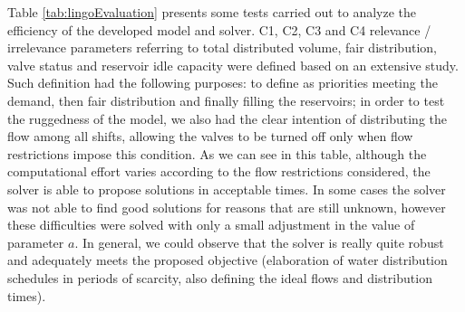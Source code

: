 \documentclass{singlecol}
\theoremstyle{TH}{
\newtheorem{lemma}{Lemma}
\newtheorem{theorem}[lemma]{Theorem}
\newtheorem{corrolary}[lemma]{Corrolary}
\newtheorem{conjecture}[lemma]{Conjecture}
\newtheorem{proposition}[lemma]{Proposition}
\newtheorem{claim}[lemma]{Claim}
\newtheorem{stheorem}[lemma]{Wrong Theorem}
\newtheorem{algorithm}{Algorithm}
}
\theoremstyle{THrm}{
\newtheorem{definition}{Definition}[section]
\newtheorem{question}{Question}[section]
\newtheorem{remark}{Remark}
\newtheorem{scheme}{Scheme}
}
\theoremstyle{THhit}{
\newtheorem{case}{Case}[section]
}
\begin{document}
Table \ref{tab:lingoEvaluation} presents some tests carried out to analyze the efficiency of the developed model and solver. C1, C2, C3 and C4 relevance / irrelevance parameters referring to total distributed volume, fair distribution, valve status and reservoir idle capacity were defined based on an extensive study. Such definition had the following purposes: to define as priorities meeting the demand, then fair distribution and finally filling the reservoirs; in order to test the ruggedness of the model, we also had the clear intention of distributing the flow among all shifts, allowing the valves to be turned off only when flow restrictions impose this condition. As we can see in this table, although the computational effort varies according to the flow restrictions considered, the solver is able to propose solutions in acceptable times. In some cases the solver was not able to find good solutions for reasons that are still unknown, however these difficulties were solved with only a small adjustment in the value of parameter $a$. In general, we could observe that the solver is really quite robust and adequately meets the proposed objective (elaboration of water distribution schedules in periods of scarcity, also defining the ideal flows and distribution times).
\end{document}
